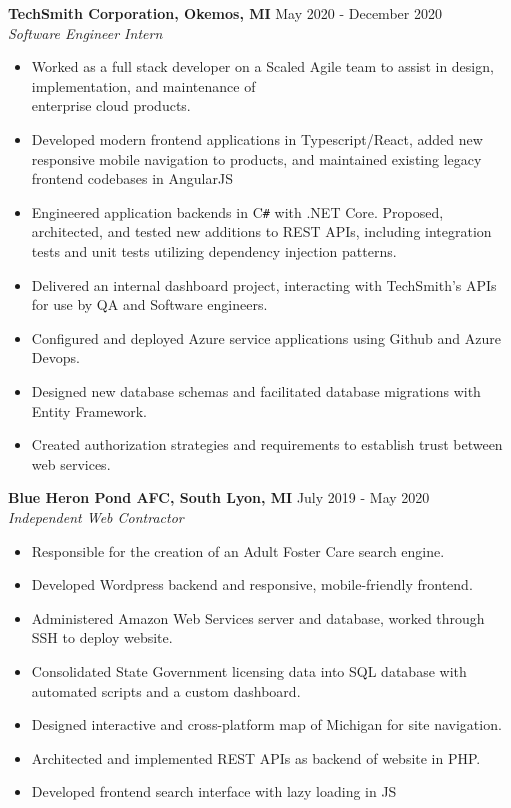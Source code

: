 \documentclass[overlapped]{res}
\begin{document}
\begin{resume}
\begin{itemize}
    \end{itemize}
    
    \textbf{TechSmith Corporation, Okemos, MI}
    \hfill May 2020 - December 2020 \\
    {\sl Software Engineer Intern}
    \begin{itemize}  \itemsep -2pt %
        \item Worked as a full stack developer on a Scaled Agile team to assist in design, implementation, and maintenance of \\
              enterprise cloud products. 
        \item Developed modern frontend applications in Typescript/React, added new responsive mobile navigation to products, and maintained existing legacy frontend codebases in AngularJS
        \item Engineered application backends in C\texttt{\#} with .NET Core. Proposed, architected, and tested new additions to REST APIs,
              including integration tests and unit tests utilizing dependency injection patterns.
        \item Delivered an internal dashboard project, interacting with TechSmith's APIs for use by QA and Software engineers.
        \item Configured and deployed Azure service applications using Github and Azure Devops. 
        \item Designed new database schemas and facilitated database migrations with Entity Framework.
        \item Created authorization strategies and requirements to establish trust between web services.
    \end{itemize}
    
    \textbf{Blue Heron Pond AFC, South Lyon, MI}
    \hfill July 2019 - May 2020 \\
    {\sl Independent Web Contractor}
    \begin{itemize}  \itemsep -2pt %
        \item Responsible for the creation of an Adult Foster Care search engine. 
        \item Developed Wordpress backend and responsive, mobile-friendly frontend.
        \item Administered Amazon Web Services server and database, worked through SSH to deploy website.
        \item Consolidated State Government licensing data into SQL database with automated scripts and a custom dashboard.
        \item Designed interactive and cross-platform map of Michigan for site navigation.
        \item Architected and implemented REST APIs as backend of website in PHP. 
        \item Developed frontend search interface with lazy loading in JS
    \end{itemize}
    

\end{resume}
\end{document}
